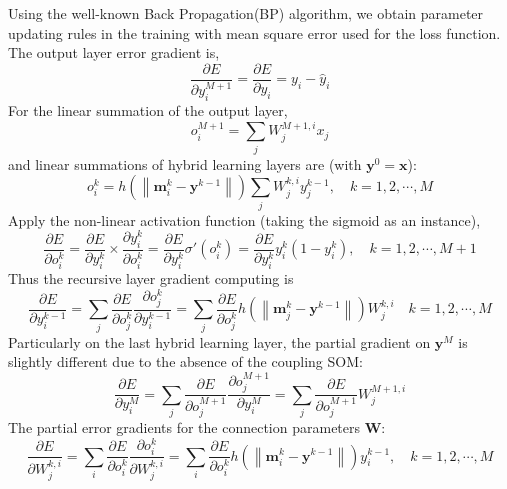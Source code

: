 \documentclass[3p,times,procedia]{elsarticle}
\begin{document}
Using the well-known Back Propagation(BP)
algorithm, we obtain parameter updating
rules in the training with mean square error 
used for the loss function. 
The output layer error gradient is,
\begin{equation}
	\frac{\partial E}
	{\partial y_i^{M+1}}=
	\frac{\partial E}
	{\partial y_i}=
	y_i-\hat{y}_i
	\label{eq:21}
\end{equation}
For the linear summation of the output layer,
\begin{equation}
	o_i^{M+1}=
	\sum_j
	W_j^{M+1,i}
	x_j
	\label{eq:22}
\end{equation}
and linear summations of hybrid learning
layers are (with $\mathbf{y}^0=\mathbf{x}$):
\begin{equation}
	o_i^k =
	h\left(
	\left\|
	\mathbf{m}_i^k-\mathbf{y}^{k-1}
	\right\|
	\right)
	\sum_j 
	W_j^{k,i}
	y_j^{k-1},
	\quad k=1,2,\cdots,M
	\label{eq:23}
\end{equation}
Apply the non-linear activation function
(taking the sigmoid as an instance),
\begin{equation}
	\frac{\partial E}
	{\partial o_i^k}=
	\frac{\partial E}
	{\partial y_i^k}\times
	\frac{\partial y_i^k}
	{\partial o_i^k}=
	\frac{\partial E}
	{\partial y_i^k}
	\sigma'(o_i^k)=
	\frac{\partial E}
	{\partial y_i^k}
	y_i^k\left(
	1-y_i^k
	\right),
	\quad k=1,2,\cdots,M+1
	\label{eq:24}
\end{equation}
Thus the recursive layer gradient computing
is
\begin{equation}
	\frac{\partial E}
	{\partial y_i^{k-1}}=\sum_j
	\frac{\partial E}
	{\partial o_j^k}
	\frac{\partial o_j^k}
	{\partial y_i^{k-1}}=\sum_j
	\frac{\partial E}
	{\partial o_j^k}
	h\left(
	\left\|
	\mathbf{m}_j^k-
	\mathbf{y}^{k-1}
	\right\|
	\right)
	W_j^{k,i}
	\quad k=1,2,\cdots,M
	\label{eq:25}
\end{equation}
Particularly on the last hybrid learning
layer, the partial gradient on 
$\mathbf{y}^M$ is slightly different due
to the absence of the coupling SOM:
\begin{equation}
	\frac{\partial E}
	{\partial y_i^M}=\sum_j
	\frac{\partial E}
	{\partial o_j^{M+1}}
	\frac{\partial o_j^{M+1}}
	{\partial y_i^M}=\sum_j
	\frac{\partial E}
	{\partial o_j^{M+1}}
	W_j^{M+1,i}
	\label{eq:26}
\end{equation}
The partial error gradients for the
connection parameters $\mathbf{W}$:
\begin{equation}
	\frac{\partial E}
	{\partial W_j^{k,i}}=\sum_i
	\frac{\partial E}
	{\partial o_i^k}
	\frac{\partial o_i^k}
	{\partial W_j^{k,i}}=\sum_i
	\frac{\partial E}
	{\partial o_i^k}
	h\left(
	\left\|
	\mathbf{m}_i^k-
	\mathbf{y}^{k-1}
	\right\|
	\right)
	y_i^{k-1},
	\quad k=1,2,\cdots,M
	\label{eq:27}
\end{equation}
\end{document}
